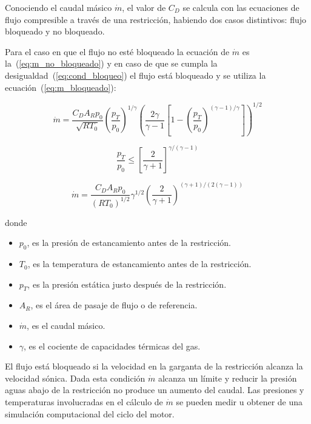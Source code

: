 Conociendo el caudal másico $\dot{m}$, el valor de $C_{D}$  se calcula con las
ecuaciones de flujo compresible a través de una restricción, habiendo dos casos
distintivos: flujo bloqueado y no bloqueado.

Para el caso en que el flujo no esté bloqueado la ecuación de $\dot{m}$ es
la~(\ref{eq:m_no_bloqueado}) y en caso de que se cumpla la
desigualdad~(\ref{eq:cond_bloqueo}) el flujo está bloqueado y se utiliza la
ecuación~(\ref{eq:m_bloqueado}):
%

\begin{equation}\label{eq:m_no_bloqueado}
    \dot{m} = \frac{C_D A_R p_0}{\sqrt{R T_0}} {\left(\frac{p_T}{p_0} \right)}^{1/\gamma} {\left( \frac{2\gamma}{\gamma-1} \left[1- {(\frac{p_T}{p_0})}^{{(\gamma-1)}/\gamma} \right] \right)}^{1/2}
\end{equation}

\begin{equation}\label{eq:cond_bloqueo}
  \frac{p_T}{p_0} \le {[\frac{2}{\gamma+1}]}^{\gamma/(\gamma - 1)}
\end{equation}

\begin{equation}\label{eq:m_bloqueado}
  \dot{m}=  \frac {C_D A_R p_0} {{(R T_0)}^{1/2}} \gamma^{1/2} {\left( \frac{2}{\gamma+1} \right)}^{(\gamma+1)/(2(\gamma-1))}
\end{equation}

donde
\begin{itemize}
    \item $p_0$, es la presión de estancamiento antes de la restricción.
    \item $T_0$, es la temperatura de estancamiento antes de la restricción.
    \item $p_T$, es la presión estática justo después de la restricción.
    \item $A_R$, es el área de pasaje de flujo o de referencia.
    \item $\dot{m}$, es el caudal másico.
  \item $\gamma$, es el cociente de capacidades térmicas del gas.
\end{itemize}


El flujo está bloqueado si la velocidad en la garganta de la restricción
alcanza la velocidad sónica. 
%
Dada esta condición $\dot{m}$ alcanza un límite y reducir la presión aguas
abajo de la restricción no produce un aumento del caudal.
%
%
Las presiones y temperaturas involucradas en el cálculo de $\dot{m}$ se pueden
medir u obtener de una simulación computacional del ciclo del motor.
%

